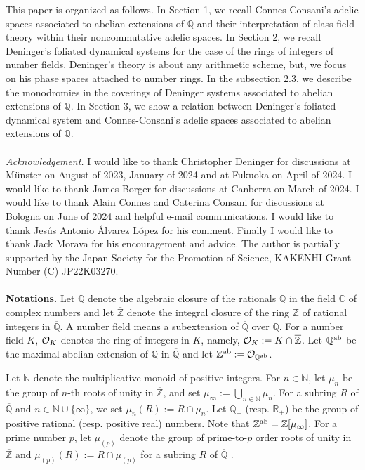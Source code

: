 \documentclass[12pt, leqno]{article}
\begin{document}
This paper is organized as follows. In Section 1, we recall Connes-Consani's adelic spaces associated to abelian extensions of $\mathbb{Q}$ and  their interpretation of class field theory within their noncommutative adelic spaces. In Section 2, we recall Deninger's foliated dynamical systems for the case of the rings of integers of number fields. Deninger's theory is about any arithmetic scheme, but, we focus on  his phase spaces attached to number rings.  In the subsection 2.3, we describe the monodromies in the coverings of Deninger systems associated to abelian extensions of $\mathbb{Q}$. In Section 3, we show a relation between Deninger's foliated dynamical system and Connes-Consani's adelic spaces associated to abelian extensions of $\mathbb{Q}$.\\
\\
{\it Acknowledgement.} I would like to thank Christopher Deninger for discussions at M\"{u}nster on August of 2023, January of 2024 and at Fukuoka on April of 2024. I would like to thank James Borger for discussions at Canberra on March of 2024. I would like to thank Alain Connes and Caterina Consani for discussions at Bologna on June of 2024 and helpful e-mail communications.  I would like to thank Jes\'{u}s Antonio \'{A}lvarez L\'{o}pez for his comment. Finally I would like to thank Jack Morava  for his encouragement and advice. The author is partially supported by the Japan Society for the Promotion of Science, KAKENHI Grant Number (C) JP22K03270.  \\
\\
{\bf Notations.}  Let $\overline{\mathbb{Q}}$ denote the algebraic closure of the rationals $\mathbb{Q}$ in the field $\mathbb{C}$ of complex numbers and let $\overline{\mathbb{Z}}$ denote the integral closure of the ring $\mathbb{Z}$ of rational integers in $\overline{\mathbb{Q}}$.  A number field means a subextension of $\overline{\mathbb{Q}}$ over $\mathbb{Q}$. For a number field $K$, ${\cal O}_K$ denotes the ring of integers in $K$, namely, ${\cal O}_K := K \cap \overline{\mathbb{Z}}$. 
Let $\mathbb{Q}^{\rm ab}$ be the maximal abelian extension of $\mathbb{Q}$ in $\overline{\mathbb{Q}}$ and let $\mathbb{Z}^{\rm ab} := {\cal O}_{\mathbb{Q}^{\rm ab}}$. 

Let $\mathbb{N}$ denote the multiplicative monoid of positive integers.  For $n \in \mathbb{N}$, let $\mu_n$ be the group of $n$-th roots of unity in $\overline{\mathbb{Z}}$, and set $\mu_{\infty} := \bigcup_{n \in \mathbb{N}} \mu_n$. For a subring $R$ of  $\overline{\mathbb{Q}}$ and $n \in \mathbb{N} \cup \{ \infty\}$, we set  $\mu_n(R) := R \cap \mu_n$.   Let $\mathbb{Q}_+$ (resp. $\mathbb{R}_+$) be the group of positive rational (resp. positive real) numbers. Note that $\mathbb{Z}^{\rm ab} = \mathbb{Z}[\mu_{\infty}]$. For a prime number $p$, let $\mu_{(p)}$ denote the group of prime-to-$p$ order roots of unity in $\overline{\mathbb{Z}}$ and  $\mu_{(p)}(R) := R \cap \mu_{(p)}$ for a subring $R$ of  $\overline{\mathbb{Q}}$ .
\end{document}
